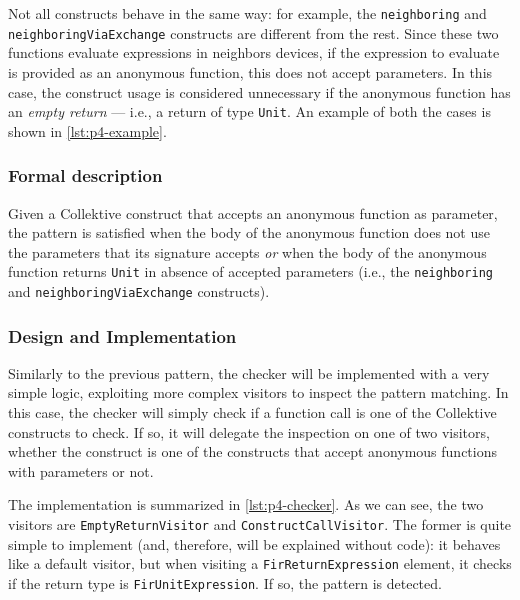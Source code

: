\documentclass[12pt,a4paper,openright,twoside]{book}
\begin{document}
Not all constructs behave in the same way: for example, the
\lstinline{neighboring} and \lstinline{neighboringViaExchange} constructs are
different from the rest. Since these two functions evaluate expressions in
neighbors devices, if the expression to evaluate is provided as an anonymous
function, this does not accept parameters. In this case, the construct usage is
considered unnecessary if the anonymous function has an \emph{empty return} ---
i.e., a return of type \lstinline{Unit}. 
%
An example of both the cases is shown in \cref{lst:p4-example}.



\subsubsection{Formal description}

Given a Collektive construct that accepts an anonymous function as parameter,
the pattern is satisfied when the body of the anonymous function does not use the
parameters that its signature accepts \emph{or} when the body of the anonymous
function returns \lstinline{Unit} in absence of accepted parameters (i.e., the
\lstinline{neighboring} and \lstinline{neighboringViaExchange} constructs).

\subsubsection{Design and Implementation}

Similarly to the previous pattern, the checker will be implemented with a very
simple logic, exploiting more complex visitors to inspect the pattern matching.
In this case, the checker will simply check if a function call is one of the 
Collektive constructs to check. If so, it will delegate the inspection on one
of two visitors, whether the construct is one of the constructs that accept
anonymous functions with parameters or not.

The implementation is summarized in \cref{lst:p4-checker}. As we can see, the
two visitors are \lstinline{EmptyReturnVisitor} and
\lstinline{ConstructCallVisitor}. The former is quite simple to implement (and,
therefore, will be explained without code): it behaves like a default
visitor, but when visiting a \lstinline{FirReturnExpression} element, it checks
if the return type is \lstinline{FirUnitExpression}. If so, the pattern is
detected.
\end{document}

